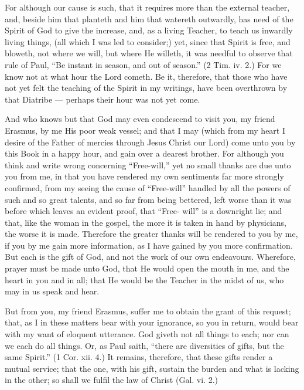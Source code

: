 For although our cause is such, that it requires more than the external teacher, and, beside him that planteth and him that watereth outwardly, has need of the Spirit of God to give the increase, and, as a living Teacher, to teach us inwardly living things, (all which I was led to consider;) yet, since that Spirit is free, and bloweth, not where we will, but where He willeth, it was needful to observe that rule of Paul, “Be instant in season, and out of season.” (2 Tim. iv. 2.) For we know not at what hour the Lord cometh. Be it, therefore, that those who have not yet felt the teaching of the Spirit in my writings, have been overthrown by that Diatribe — perhaps their hour was not yet come.

And who knows but that God may even condescend to visit you, my friend Erasmus, by me His poor weak vessel; and that I may (which from my heart I desire of the Father of mercies through Jesus Christ our Lord) come unto you by this Book in a happy hour, and gain over a dearest brother. For although you think and write wrong concerning “Free-will,” yet no small thanks are due unto you from me, in that you have rendered my own sentiments far more strongly confirmed, from my seeing the cause of “Free-will” handled by all the powers of such and so great talents, and so far from being bettered, left worse than it was before which leaves an evident proof, that “Free- will” is a downright lie; and that, like the woman in the gospel, the more it is taken in hand by physicians, the worse it is made. Therefore the greater thanks will be rendered to you by me, if you by me gain more information, as I have gained by you more confirmation. But each is the gift of God, and not the work of our own endeavours. Wherefore, prayer must be made unto God, that He would open the mouth in me, and the heart in you and in all; that He would be the Teacher in the midst of us, who may in us speak and hear.

But from you, my friend Erasmus, suffer me to obtain the grant of this request; that, as I in these matters bear with your ignorance, so you in return, would bear with my want of eloquent utterance. God giveth not all things to each; nor can we each do all things. Or, as Paul saith, “there are diversities of gifts, but the same Spirit.” (1 Cor. xii. 4.) It remains, therefore, that these gifts render a mutual service; that the one, with his gift, sustain the burden and what is lacking in the other; so shall we fulfil the law of Christ (Gal. vi. 2.)


